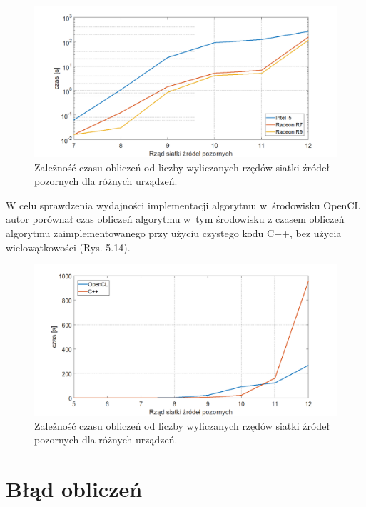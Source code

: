 \begin{figure}[h]
        \centering
                \centering
                \includegraphics[width=16cm]{wykres}
	\caption{Zależność czasu obliczeń od liczby wyliczanych rzędów siatki źródeł pozornych dla różnych urządzeń.}
\end{figure}

W celu sprawdzenia wydajności implementacji algorytmu w~środowisku OpenCL autor porównał czas obliczeń algorytmu w~tym środowisku z czasem obliczeń algorytmu zaimplementowanego przy użyciu czystego kodu C++, bez użycia wielowątkowości (Rys. 5.14).

\begin{figure}[h]
        \centering
                \centering
                \includegraphics[width=16cm]{wykres2}
	\caption{Zależność czasu obliczeń od liczby wyliczanych rzędów siatki źródeł pozornych dla różnych urządzeń.}
\end{figure}


\section{Błąd obliczeń}\label{sec:asdas2sd}

